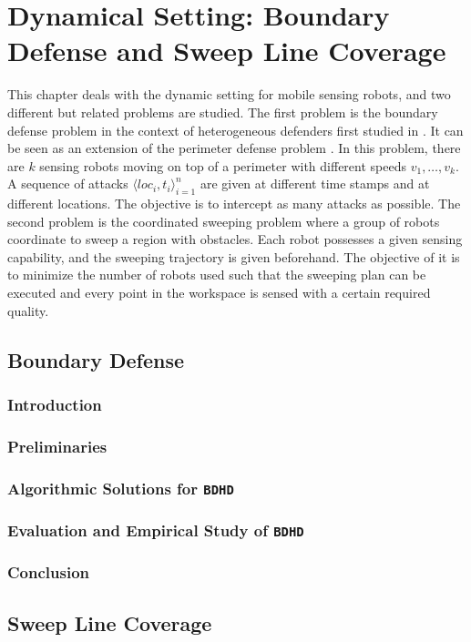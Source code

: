
\chapter{Dynamical Setting: Boundary Defense and Sweep Line Coverage}
\thispagestyle{myheadings}

This chapter deals with the dynamic setting for mobile sensing robots, 
and two different but related problems are studied. 
The first problem is the boundary defense problem in the context of heterogeneous defenders first studied in \cite{adler2022role}.
It can be seen as an extension of the perimeter defense problem \cite{shishika2020review}. 
In this problem, there are $k$ sensing robots moving on top of a perimeter with different speeds $v_1,\dots,v_k$.
A sequence of attacks $\langle loc_i, t_i \rangle_{i=1}^{n}$ are given at different time stamps and at different locations.
The objective is to intercept as many attacks as possible.
The second problem is the coordinated sweeping problem where a group of robots coordinate to sweep a region 
with obstacles. Each robot possesses a given sensing capability, and the sweeping trajectory is 
given beforehand. The objective of it is to minimize the number of robots used such that the sweeping plan 
can be executed and every point in the workspace is sensed with a certain required quality. 

\section{Boundary Defense}
\def\prob{{\texttt{{BDHD}}}\xspace}
\def\ours{{{{EDP}}}\xspace}
\def\oours{{{{OEDP}}}\xspace}
\subsection{Introduction}
\label{sec:bd-intro}
\subsection{Preliminaries}\label{sec:bd-preliminary}

\subsection{Algorithmic Solutions for \prob}\label{sec:bd-algorithm}

\subsection{Evaluation and Empirical Study of \prob}\label{sec:bd-evaluation}

\subsection{Conclusion}\label{sec:bd-conclusion}



\section{Sweep Line Coverage}






